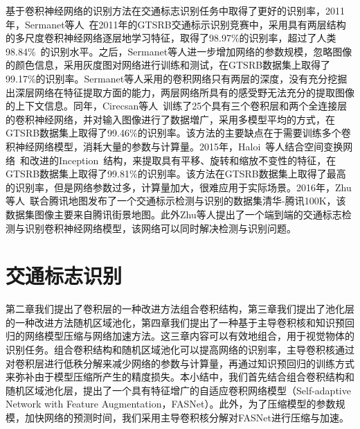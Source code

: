 基于卷积神经网络的识别方法在交通标志识别任务中取得了更好的识别率，2011年，Sermanet等人~\cite{sermanet2011traffic}在2011年的GTSRB交通标示识别竞赛中，采用具有两层结构的多尺度卷积神经网络逐层地学习特征，取得了98.97\%的识别率，超过了人类98.84\%~\cite{stallkamp2011german}的识别水平。之后，Sermanet等人进一步增加网络的参数规模，忽略图像的颜色信息，采用灰度图对网络进行训练和测试，在GTSRB数据集上取得了99.17\%的识别率。Sermanet等人采用的卷积网络只有两层的深度，没有充分挖掘出深层网络在特征提取方面的能力，两层网络所具有的感受野无法充分的提取图像的上下文信息。同年，Cirecsan等人~\cite{cirecsan2011committee}训练了25个具有三个卷积层和两个全连接层的卷积神经网络，并对输入图像进行了数据増广，采用多模型平均的方式，在GTSRB数据集上取得了99.46\%的识别率。该方法的主要缺点在于需要训练多个卷积神经网络模型，消耗大量的参数与计算量。2015年，Haloi~\cite{haloi2015traffic}等人结合空间变换网络~\cite{jaderberg2015spatial}和改进的Inception~\cite{szegedy2014going,szegedy2015rethinking,szegedy2016inception}结构，来提取具有平移、旋转和缩放不变性的特征，在GTSRB数据集上取得了99.81\%的识别率。该方法在GTSRB数据集上取得了最高的识别率，但是网络参数过多，计算量加大，很难应用于实际场景。2016年，Zhu等人~\cite{zhu2016traffic}联合腾讯地图发布了一个交通标示检测与识别的数据集清华-腾讯100K，该数据集图像主要来自腾讯街景地图。此外Zhu等人提出了一个端到端的交通标志检测与识别卷积神经网络模型，该网络可以同时解决检测与识别问题。

\section{交通标志识别}
\label{sec:seg:model}

第二章我们提出了卷积层的一种改进方法组合卷积结构，第三章我们提出了池化层的一种改进方法随机区域池化，第四章我们提出了一种基于主导卷积核和知识预回归的网络模型压缩与网络加速方法。这三章内容可以有效地组合，用于视觉物体的识别任务。组合卷积结构和随机区域池化可以提高网络的识别率，主导卷积核通过对卷积层进行低秩分解来减少网络的参数与计算量，再通过知识预回归的训练方式来弥补由于模型压缩所产生的精度损失。本小结中，我们首先结合组合卷积结构和随机区域池化层，提出了一个具有特征增广的自适应卷积网络模型（Self-adaptive Network with Feature Augmentation，FASNet）。此外，为了压缩模型的参数规模，加快网络的预测时间，我们采用主导卷积核分解对FASNet进行压缩与加速。


